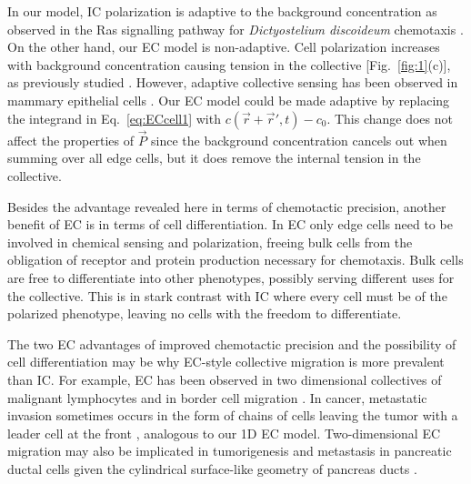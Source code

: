 In our model, IC polarization is adaptive to the background concentration as observed in the Ras signalling pathway for \textit{Dictyostelium discoideum} chemotaxis \cite{takeda2012incoherent}. On the other hand, our EC model is non-adaptive. Cell polarization increases with background concentration causing tension in the collective [Fig.\ \ref{fig:1}(c)], as previously studied \cite{camley2016emergent}. However, adaptive collective sensing has been observed in mammary epithelial cells \cite{ellison2016cell}. Our EC model could be made adaptive by replacing the integrand in Eq.\ \ref{eq:ECcell1} with
$c(\vec{r}+\vec{r}',t)-c_0$.
This change does not affect the properties of $\vec{P}$ since the background concentration cancels out when summing over all edge cells, but it does remove the internal tension in the collective.

Besides the advantage revealed here in terms of chemotactic precision, another benefit of EC is in terms of cell differentiation. In EC only edge cells need to be involved in chemical sensing and polarization, freeing bulk cells from the obligation of receptor and protein production necessary for chemotaxis. Bulk cells are free to differentiate into other phenotypes, possibly serving different uses for the collective. This is in stark contrast with IC where every cell must be of the polarized phenotype, leaving no cells with the freedom to differentiate.

The two EC advantages of improved chemotactic precision and the possibility of cell differentiation may be why EC-style collective migration is more prevalent than IC. For example, EC has been observed in two dimensional collectives of malignant lymphocytes \cite{malet2015collective} and in border cell migration \cite{cai2016modeling}. In cancer, metastatic invasion sometimes occurs in the form of chains of cells leaving the tumor with a leader cell at the front \cite{cheung2013collective,friedl2009collective}, analogous to our 1D EC model. Two-dimensional EC migration may also be implicated in tumorigenesis and metastasis in pancreatic ductal cells given the cylindrical surface-like geometry of pancreas ducts
\cite{bardeesy2002pancreatic}.


